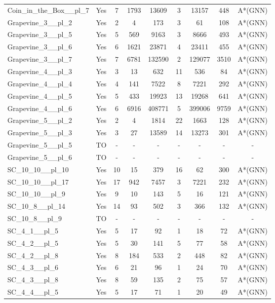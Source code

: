 \documentclass{article}
\begin{document}
\begin{tabular}{lcccccccc}
Coin\_in\_the\_Box\_\_pl\_7 & Yes & 7 & 1793 & 13609 & 3 & 13157 & 448 & A*(GNN) \\
Grapevine\_3\_\_pl\_2 & Yes & 2 & 4 & 173 & 3 & 61 & 108 & A*(GNN) \\
Grapevine\_3\_\_pl\_5 & Yes & 5 & 569 & 9163 & 3 & 8666 & 493 & A*(GNN) \\
Grapevine\_3\_\_pl\_6 & Yes & 6 & 1621 & 23871 & 4 & 23411 & 455 & A*(GNN) \\
Grapevine\_3\_\_pl\_7 & Yes & 7 & 6781 & 132590 & 2 & 129077 & 3510 & A*(GNN) \\
Grapevine\_4\_\_pl\_3 & Yes & 3 & 13 & 632 & 11 & 536 & 84 & A*(GNN) \\
Grapevine\_4\_\_pl\_4 & Yes & 4 & 141 & 7522 & 8 & 7221 & 292 & A*(GNN) \\
Grapevine\_4\_\_pl\_5 & Yes & 5 & 433 & 19923 & 13 & 19268 & 641 & A*(GNN) \\
Grapevine\_4\_\_pl\_6 & Yes & 6 & 6916 & 408771 & 5 & 399006 & 9759 & A*(GNN) \\
Grapevine\_5\_\_pl\_2 & Yes & 2 & 4 & 1814 & 22 & 1663 & 128 & A*(GNN) \\
Grapevine\_5\_\_pl\_3 & Yes & 3 & 27 & 13589 & 14 & 13273 & 301 & A*(GNN) \\
Grapevine\_5\_\_pl\_5 & TO & - & - & - & - & - & - & - \\
Grapevine\_5\_\_pl\_6 & TO & - & - & - & - & - & - & - \\
SC\_10\_10\_\_pl\_10 & Yes & 10 & 15 & 379 & 16 & 62 & 300 & A*(GNN) \\
SC\_10\_10\_\_pl\_17 & Yes & 17 & 942 & 7457 & 3 & 7221 & 232 & A*(GNN) \\
SC\_10\_10\_\_pl\_9 & Yes & 9 & 10 & 143 & 5 & 16 & 121 & A*(GNN) \\
SC\_10\_8\_\_pl\_14 & Yes & 14 & 93 & 502 & 3 & 366 & 132 & A*(GNN) \\
SC\_10\_8\_\_pl\_9 & TO & - & - & - & - & - & - & - \\
SC\_4\_1\_\_pl\_5 & Yes & 5 & 17 & 92 & 1 & 18 & 72 & A*(GNN) \\
SC\_4\_2\_\_pl\_5 & Yes & 5 & 30 & 141 & 5 & 77 & 58 & A*(GNN) \\
SC\_4\_2\_\_pl\_8 & Yes & 8 & 184 & 533 & 2 & 448 & 82 & A*(GNN) \\
SC\_4\_3\_\_pl\_6 & Yes & 6 & 21 & 96 & 1 & 24 & 70 & A*(GNN) \\
SC\_4\_3\_\_pl\_8 & Yes & 8 & 59 & 135 & 2 & 75 & 57 & A*(GNN) \\
SC\_4\_4\_\_pl\_5 & Yes & 5 & 17 & 71 & 1 & 20 & 49 & A*(GNN) \\

\end{tabular}
\end{document}
